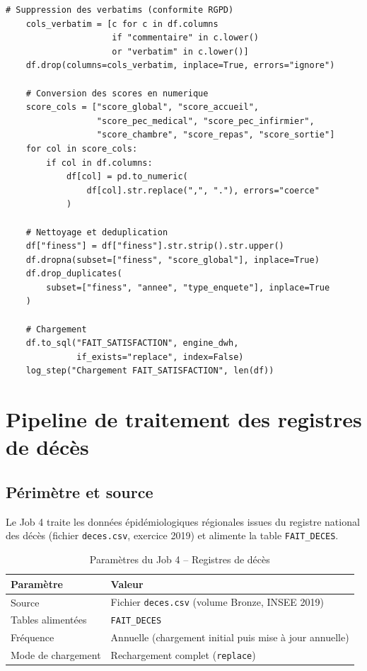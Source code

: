 \documentclass[12pt, a4paper]{report}
\begin{document}
\begin{itemize}[label=\textcolor{chuBlue}{\textbullet}]
\begin{lstlisting}[style=python, caption={Job 3 -- traitement des fichiers de satisfaction}, label={lst:job3}]
    # Suppression des verbatims (conformite RGPD)
    cols_verbatim = [c for c in df.columns
                     if "commentaire" in c.lower()
                     or "verbatim" in c.lower()]
    df.drop(columns=cols_verbatim, inplace=True, errors="ignore")

    # Conversion des scores en numerique
    score_cols = ["score_global", "score_accueil",
                  "score_pec_medical", "score_pec_infirmier",
                  "score_chambre", "score_repas", "score_sortie"]
    for col in score_cols:
        if col in df.columns:
            df[col] = pd.to_numeric(
                df[col].str.replace(",", "."), errors="coerce"
            )

    # Nettoyage et deduplication
    df["finess"] = df["finess"].str.strip().str.upper()
    df.dropna(subset=["finess", "score_global"], inplace=True)
    df.drop_duplicates(
        subset=["finess", "annee", "type_enquete"], inplace=True
    )

    # Chargement
    df.to_sql("FAIT_SATISFACTION", engine_dwh,
              if_exists="replace", index=False)
    log_step("Chargement FAIT_SATISFACTION", len(df))
\end{lstlisting}

\section{Pipeline de traitement des registres de décès}
\label{sec:job4}

\subsection{Périmètre et source}

Le Job 4 traite les données épidémiologiques régionales issues du registre national des décès (fichier \texttt{deces.csv}, exercice 2019) et alimente la table \texttt{FAIT\_DECES}.

\begin{table}[htbp]
\centering\footnotesize\renewcommand{\arraystretch}{1.4}
\begin{tabularx}{\linewidth}{@{} L{3.5cm} X @{}}
\toprule
{}
\textbf{Paramètre} & \textbf{Valeur} \\
\midrule
Source & Fichier \texttt{deces.csv} (volume Bronze, INSEE 2019) \\
Tables alimentées & \texttt{FAIT\_DECES} \\
Fréquence & Annuelle (chargement initial puis mise à jour annuelle) \\
Mode de chargement & Rechargement complet (\texttt{replace}) \\
\bottomrule
\end{tabularx}
\caption{Paramètres du Job 4 -- Registres de décès}
\label{tab:job4_params}
\end{table}


\end{itemize}
\end{document}
